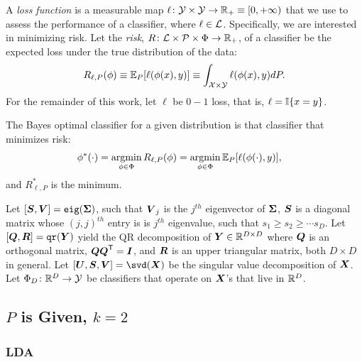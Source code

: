 \documentclass[10pt]{article}
\begin{document}
A \emph{loss function} is a measurable map $\ell {\ensuremath{\colon}}  \mathcal{Y} \times \mathcal{Y} \to \mathbb{R}_+ \equiv [0,+\infty)$ that we use to assess the performance of a classifier, where $\ell \in \mathcal{L}$.  Specifically, we are interested in minimizing risk.
Let the \emph{risk}, $R {\colon} \mathcal{L} \times \mathcal{P} \times \Phi \to \mathbb{R}_+$, of a classifier be the expected loss under the true distribution of the data:
\begin{align}
	R_{\ell,P}(\phi) \equiv \mathbb{E}_P[\ell(\phi(x),y)] \equiv  \int_{\mathcal{X} \times \mathcal{Y}} \ell(\phi(x),y) dP.
\end{align}
For the remainder of this work, let $\ell$ be $0-1$ loss, that is, $\ell=\mathbb{I}\{x = y\}$. 

The Bayes optimal classifier for a given distribution is that classifier that minimizes risk:
\begin{align}
	\phi^*(\cdot) &= \argmin_{\phi \in \Phi} R_{\ell,P}(\phi)= \argmin_{\phi \in \Phi} \EE_P[\ell(\phi(\cdot),y)],
\end{align}
and $R_{\ell,P}^*$ is the minimum.

Let $[\boldsymbol{S},\boldsymbol{V}]={\sc \texttt{eig}}(\boldsymbol{\Sigma})$, such that $\boldsymbol{V}_j$ is the $j^{th}$ eigenvector of $\boldsymbol{\Sigma}$, $\boldsymbol{S}$ is a diagonal matrix whose $(j,j)^{th}$ entry is is $j^{th}$ eigenvalue, such that $s_1 \geq s_2 \geq \cdots s_D$.  Let $[\boldsymbol{Q},\boldsymbol{R}]={\sc \texttt{qr}}(\boldsymbol{Y})$ yield the QR decomposition of $\boldsymbol{Y} \in \mathbb{R}^{D \times D}$ where $\boldsymbol{Q}$ is an orthogonal matrix, $\boldsymbol{Q} \boldsymbol{Q}^{\mathsf{T}} = \boldsymbol{I}$, and $\boldsymbol{R}$ is an upper triangular matrix, both $D \times D$ in general.   Let $[\mb{U}, \mb{S}, \mb{V}]=\svd(\mb{X})$ be the singular value decomposition of $\boldsymbol{X}$. Let $\Phi_D {\colon} \mathbb{R}^D \to \mathcal{Y}$ be classifiers that operate on $\boldsymbol{X}$'s that live in $\mathbb{R}^D$. 


\subsection{$P$ is Given, $k=2$}

\subsubsection{LDA}
\end{document}
